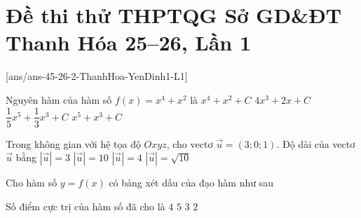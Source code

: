 \section{Đề thi thử THPTQG Sở GD\&ĐT Thanh Hóa 25--26, Lần 1}
\vspace{-0.5cm}

[ans/ans-45-26-2-ThanhHoa-YenDinh1-L1]
\caulc
\begin{ex}%
	Nguyên hàm của hàm số $f(x) = x^4 + x^2$ là
	\choice
	{$x^4 + x^2 + C$}
	{$4x^3 + 2x + C$}
	{\True $\dfrac{1}{5}x^5 + \dfrac{1}{3}x^3 + C$}
	{$x^5 + x^3 + C$}
\end{ex}

\begin{ex}%
	Trong không gian với hệ tọa độ $Oxyz$, cho vectơ $\vec{u} = (3;0;1)$. Độ dài của vectơ $\vec{u}$ bằng
	\choice
	{$\left|\vec{u}\right| = 3$}
	{$\left|\vec{u}\right| = 10$}
	{$\left|\vec{u}\right| = 4$}
	{\True $\left|\vec{u}\right| = \sqrt{10}$}
\end{ex}

\begin{ex}%
	Cho hàm số $y = f(x)$ có bảng xét dấu của đạo hàm như sau
	\begin{center}
	\end{center}
	Số điểm cực trị của hàm số đã cho là
	\choice
	{\True $4$}
	{$5$}
	{$3$}
	{$2$}
\end{ex}

